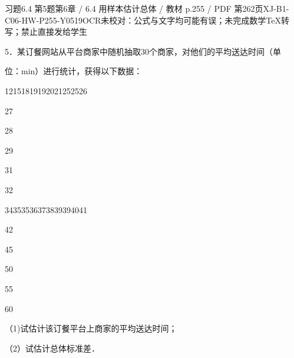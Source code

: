 \begin{bankitem}{习题6.4 第5题}{第6章 / 6.4 用样本估计总体 / 教材 p.255 / PDF 第262页}{XJ-B1-C06-HW-P255-Y0519}{OCR未校对：公式与文字均可能有误；未完成数学TeX转写；禁止直接发给学生}
\begin{ocrdraft}
\par
5．某订餐网站从平台商家中随机抽取30个商家，对他们的平均送达时间（单
\par
位：min）进行统计，获得以下数据：
\par
12151819192021252526
\par
27
\par
28
\par
29
\par
31
\par
32
\par
34353536373839394041
\par
42
\par
45
\par
50
\par
55
\par
60
\par
（1)试估计该订餐平台上商家的平均送达时间；
\par
（2）试估计总体标准差．
\end{ocrdraft}
\end{bankitem}
